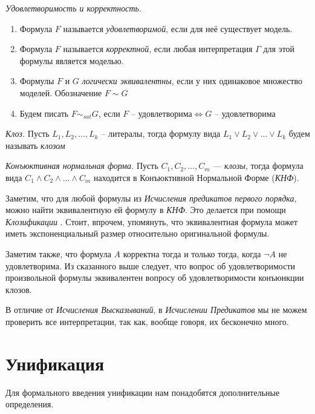 \begin{definition}
  \emph{Удовлетворимость и корректность.} 
  \begin{enumerate}
  	\item Формула $F$ называется \textit{удовлетворимой}, если для неё существует модель.
  	\item Формула $F$ называется \textit{корректной}, если любая интерпретация $\Gamma$ для этой формулы является моделью.
  	\item Формулы $F$ и $G$ \textit{логически эквивалентны}, если у них одинаковое множество моделей. Обозначение $F \sim G$
  	\item Будем писать $F \sim_{sat} G$, если $F \text{ -- удовлетворима} \iff G \text{ -- удовлетворима}$
  \end{enumerate}
\end{definition}

\begin{definition}
  \emph{Клоз.} Пусть $L_1, L_2, \ldots, L_k$ -- литералы, тогда формулу вида $L_1 \vee L_2 \vee \dots \vee L_k$ будем называть \emph{клозом}
\end{definition}

\begin{definition}
  \emph{Конъюктивная нормальная форма.} Пусть $C_1, C_2, \ldots, C_m$ --- \emph{клозы}, тогда формула вида $C_1 \wedge C_2 \wedge \dots \wedge C_m$ находится в Конъюктивной Нормальной Форме (\emph{КНФ}).
\end{definition}

Заметим, что для любой формулы из \emph{Исчисления предикатов первого порядка}, можно найти эквивалентную ей формулу в \emph{КНФ}. Это делается при помощи \textit{Клозификации} \cite{clausification}. Стоит, впрочем, упомянуть, что эквивалентная формула может иметь экспоненциальный размер относительно оригинальной формулы.

Заметим также, что формула $A$ корректна тогда и только тогда, когда $\neg A$ не удовлетворима. Из сказанного выше следует, что вопрос об удовлетворимости произвольной формулы эквивалентен вопросу об удовлетворимости конъюнкции клозов. 

В отличие от \textit{Исчисления Высказываний}, в \textit{Исчислении Предикатов} мы не можем проверить все интерпретации, так как, вообще говоря, их бесконечно много.\\

\section{Унификация}
Для формального введения унификации нам понадобятся дополнительные определения.

